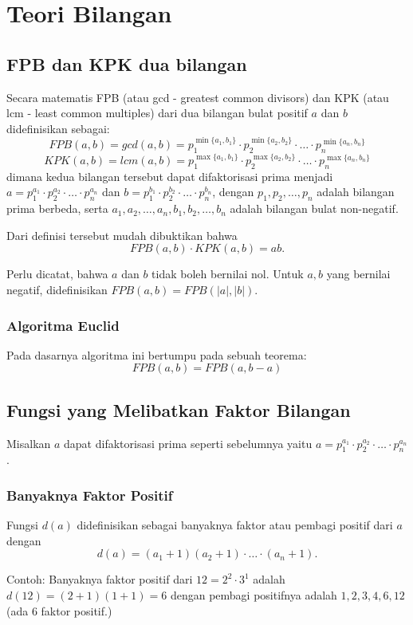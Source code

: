     
\section{Teori Bilangan}
    \subsection{FPB dan KPK dua bilangan}
    Secara matematis FPB (atau gcd - greatest common divisors) dan KPK (atau lcm - least common multiples) dari dua bilangan bulat positif $a$ dan $b$ 
    didefinisikan sebagai:
    $$FPB(a,b) = gcd(a,b) = p_1^{\min\{a_1,b_1\}}\cdot p_2^{\min\{a_2,b_2\}} \cdot \ldots \cdot p_n^{\min\{a_n,b_n\}}$$
    $$KPK(a,b) = lcm(a,b) =p_1^{\max\{a_1,b_1\}}\cdot p_2^{\max\{a_2,b_2\}} \cdot \ldots \cdot p_n^{\max\{a_n,b_n\}}$$
    dimana kedua bilangan tersebut dapat difaktorisasi prima menjadi
    $a=p_1^{a_1}\cdot p_2^{a_2}\cdot \ldots \cdot p_n^{a_n}$ dan $b=p_1^{b_1}\cdot p_2^{b_2} \cdot \ldots \cdot p_n^{b_n}$, dengan $p_1,p_2,\dots,p_n$ adalah bilangan prima berbeda, serta $a_1,a_2,\dots,a_n,b_1,b_2,\dots,b_n$ adalah bilangan bulat non-negatif.
    
    Dari definisi tersebut mudah dibuktikan bahwa
    $$FPB(a,b) \cdot KPK(a,b) = ab.$$
    
    Perlu dicatat, bahwa $a$ dan $b$ tidak boleh bernilai nol. Untuk $a,b$ yang bernilai negatif, didefinisikan $FPB(a,b) = FPB(|a|,|b|)$.
    \subsubsection{Algoritma Euclid}
    Pada dasarnya algoritma ini bertumpu pada sebuah teorema:
    $$FPB(a,b) = FPB(a,b-a)$$
    
    \subsection{Fungsi yang Melibatkan Faktor Bilangan}
    Misalkan $a$ dapat difaktorisasi prima seperti sebelumnya yaitu $a=p_1^{a_1}\cdot p_2^{a_2}\cdot \ldots \cdot p_n^{a_n}$.
    \subsubsection{Banyaknya Faktor Positif}
    Fungsi $d(a)$ didefinisikan sebagai banyaknya faktor atau pembagi positif dari $a$ dengan
    $$d(a) = (a_1+1)(a_2+1)\cdot \ldots \cdot (a_n+1).$$
    
    Contoh: Banyaknya faktor positif dari $12= 2^2 \cdot 3^1$ adalah $d(12)=(2+1)(1+1)=6$ dengan pembagi positifnya adalah $1,2,3,4,6,12$ (ada 6 faktor positif.)
    
